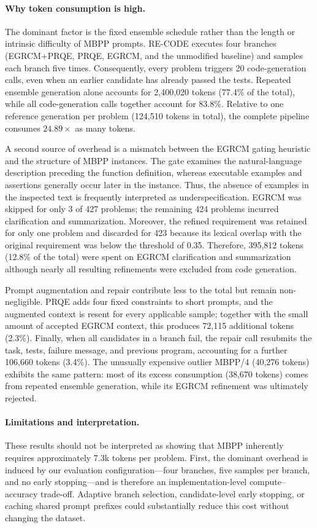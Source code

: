 \paragraph{Why token consumption is high.}
The dominant factor is the fixed ensemble schedule rather than the length or
intrinsic difficulty of MBPP prompts. RE-CODE executes four branches
(EGRCM+PRQE, PRQE, EGRCM, and the unmodified baseline) and samples each branch
five times. Consequently, every problem triggers 20 code-generation calls,
even when an earlier candidate has already passed the tests. Repeated ensemble
generation alone accounts for 2,400,020 tokens (77.4\% of the total), while
all code-generation calls together account for 83.8\%. Relative to one
reference generation per problem (124,510 tokens in total), the complete
pipeline consumes \(24.89\times\) as many tokens.

A second source of overhead is a mismatch between the EGRCM gating heuristic
and the structure of MBPP instances. The gate examines the natural-language
description preceding the function definition, whereas executable examples
and assertions generally occur later in the instance. Thus, the absence of
examples in the inspected text is frequently interpreted as underspecification.
EGRCM was skipped for only 3 of 427 problems; the remaining 424 problems
incurred clarification and summarization. Moreover, the refined requirement
was retained for only one problem and discarded for 423 because its lexical
overlap with the original requirement was below the threshold of 0.35.
Therefore, 395,812 tokens (12.8\% of the total) were spent on EGRCM
clarification and summarization although nearly all resulting refinements were
excluded from code generation.

Prompt augmentation and repair contribute less to the total but remain
non-negligible. PRQE adds four fixed constraints to short prompts, and the
augmented context is resent for every applicable sample; together with the
small amount of accepted EGRCM context, this produces 72,115 additional
tokens (2.3\%). Finally, when all candidates in a branch fail, the repair call
resubmits the task, tests, failure message, and previous program, accounting
for a further 106,660 tokens (3.4\%). The unusually expensive outlier
MBPP/4 (40,276 tokens) exhibits the same pattern: most of its excess
consumption (38,670 tokens) comes from repeated ensemble generation, while
its EGRCM refinement was ultimately rejected.

\paragraph{Limitations and interpretation.}
These results should not be interpreted as showing that MBPP inherently
requires approximately 7.3k tokens per problem. First, the dominant overhead
is induced by our evaluation configuration---four branches, five samples per
branch, and no early stopping---and is therefore an implementation-level
compute--accuracy trade-off. Adaptive branch selection, candidate-level early
stopping, or caching shared prompt prefixes could substantially reduce this
cost without changing the dataset.

